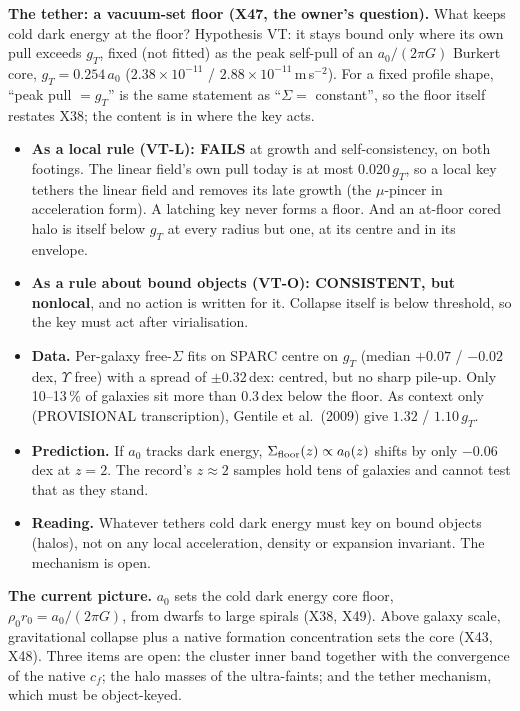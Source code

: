 \documentclass[10pt]{article}
\begin{document}
\textbf{The tether: a vacuum-set floor (X47, the owner's question).} What keeps cold dark energy at the floor? Hypothesis VT: it stays bound only where its own pull exceeds $g_T$, fixed (not fitted) as the peak self-pull of an $a_0/(2\pi G)$ Burkert core, $g_T=0.254\,a_0$ ($2.38\times10^{-11}$ / $2.88\times10^{-11}$\,m\,s$^{-2}$). For a fixed profile shape, ``peak pull $=g_T$'' is the same statement as ``$\Sigma=$ constant'', so the floor itself restates X38; the content is in where the key acts.
\begin{itemize}
\item \textbf{As a local rule (VT-L): FAILS} at growth and self-consistency, on both footings. The linear field's own pull today is at most 0.020\,$g_T$, so a local key tethers the linear field and removes its late growth (the $\mu$-pincer in acceleration form). A latching key never forms a floor. And an at-floor cored halo is itself below $g_T$ at every radius but one, at its centre and in its envelope.
\item \textbf{As a rule about bound objects (VT-O): CONSISTENT, but nonlocal}, and no action is written for it. Collapse itself is below threshold, so the key must act after virialisation.
\item \textbf{Data.} Per-galaxy free-$\Sigma$ fits on SPARC centre on $g_T$ (median $+0.07$ / $-0.02$\,dex, $\Upsilon$ free) with a spread of $\pm0.32$\,dex: centred, but no sharp pile-up. Only 10--13\,\% of galaxies sit more than 0.3\,dex below the floor. As context only (PROVISIONAL transcription), Gentile et al.\ (2009) give $1.32$ / $1.10\,g_T$.
\item \textbf{Prediction.} If $a_0$ tracks dark energy, $\Sigma_{\rm floor}(z)\propto a_0(z)$ shifts by only $-0.06$\,dex at $z=2$. The record's $z\approx2$ samples hold tens of galaxies and cannot test that as they stand.
\item \textbf{Reading.} Whatever tethers cold dark energy must key on bound objects (halos), not on any local acceleration, density or expansion invariant. The mechanism is open.
\end{itemize}

\textbf{The current picture.} $a_0$ sets the cold dark energy core floor, $\rho_0r_0=a_0/(2\pi G)$, from dwarfs to large spirals (X38, X49). Above galaxy scale, gravitational collapse plus a native formation concentration sets the core (X43, X48). Three items are open: the cluster inner band together with the convergence of the native $c_f$; the halo masses of the ultra-faints; and the tether mechanism, which must be object-keyed.
\end{document}
